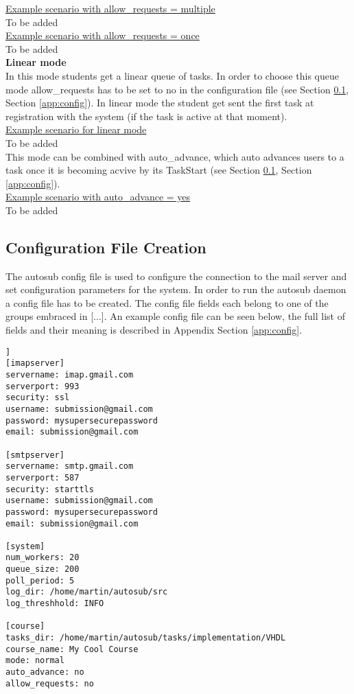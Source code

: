 \underline{Example scenario with allow\_requests = multiple}\\
To be added
\\

\underline{Example scenario with allow\_requests = once}\\
To be added
\\

\textbf{Linear mode}\\
In this mode students get a linear queue of tasks. In order to choose this queue mode allow\_requests has to be set to
no in the configuration file (see Section \ref{sub:exampleconfig}, Section \ref{app:config}). In linear mode the student
get sent the first task at registration with the system (if the task is active at that moment).\\

\underline{Example scenario for linear mode}\\
To be added
\\

This mode can be combined with auto\_advance, which auto advances users to a task once it is becoming acvive by its
TaskStart (see Section \ref{sub:exampleconfig}, Section \ref{app:config}). \\

\underline{Example scenario with auto\_advance = yes}\\
To be added

\subsection{Configuration File Creation} \label{sub:exampleconfig}
The autosub config file is used to configure the connection to the mail server and set
configuration parameters for the system. In order to run the autosub daemon a config file
has to be created. The config file fields each belong to one of the groups embraced
in [...]. An example config file can be seen below, the full list of fields and their
meaning is described in Appendix Section \ref{app:config}.

\begin{lstlisting}[frame=single,captionpos=b,caption=example.cfg, belowcaptionskip=4pt]]
[imapserver]
servername: imap.gmail.com
serverport: 993
security: ssl
username: submission@gmail.com
password: mysupersecurepassword
email: submission@gmail.com

[smtpserver]
servername: smtp.gmail.com
serverport: 587
security: starttls
username: submission@gmail.com
password: mysupersecurepassword
email: submission@gmail.com

[system]
num_workers: 20
queue_size: 200
poll_period: 5
log_dir: /home/martin/autosub/src
log_threshhold: INFO

[course]
tasks_dir: /home/martin/autosub/tasks/implementation/VHDL
course_name: My Cool Course
mode: normal
auto_advance: no
allow_requests: no
\end{lstlisting}

